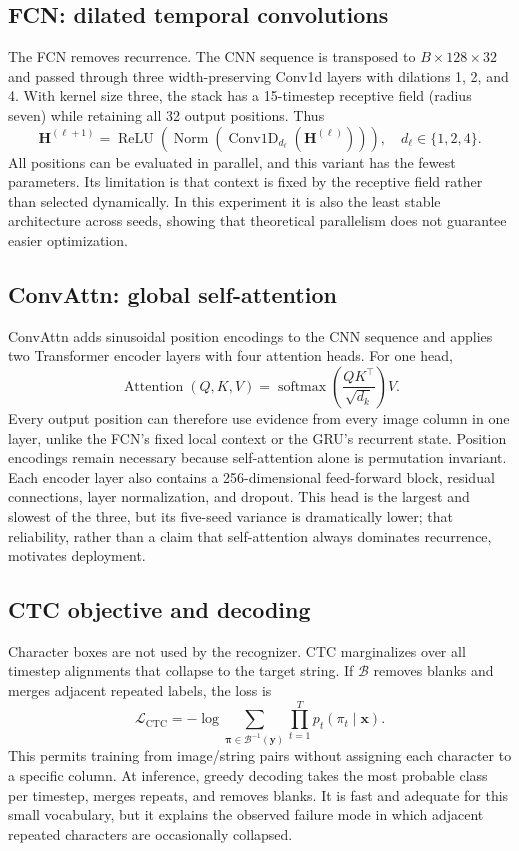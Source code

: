 \documentclass[10pt]{article}
\begin{document}
\subsection{FCN: dilated temporal convolutions}

The FCN removes recurrence. The CNN sequence is transposed to
$B\times128\times32$ and passed through three width-preserving Conv1d layers with
dilations 1, 2, and 4. With kernel size three, the stack has a 15-timestep receptive
field (radius seven) while retaining all 32 output positions. Thus
\[
 \mathbf{H}^{(\ell+1)} =
 \operatorname{ReLU}\!\left(
 \operatorname{Norm}\!\left(
 \operatorname{Conv1D}_{d_\ell}(\mathbf{H}^{(\ell)})
 \right)\right),\quad d_\ell\in\{1,2,4\}.
\]
All positions can be evaluated in parallel, and this variant has the fewest parameters.
Its limitation is that context is fixed by the receptive field rather than selected
dynamically. In this experiment it is also the least stable architecture across seeds,
showing that theoretical parallelism does not guarantee easier optimization.

\subsection{ConvAttn: global self-attention}

ConvAttn adds sinusoidal position encodings to the CNN sequence and applies two
Transformer encoder layers with four attention heads. For one head,
\[
 \operatorname{Attention}(Q,K,V)=
 \operatorname{softmax}\!\left(\frac{QK^\top}{\sqrt{d_k}}\right)V.
\]
Every output position can therefore use evidence from every image column in one layer,
unlike the FCN's fixed local context or the GRU's recurrent state. Position encodings
remain necessary because self-attention alone is permutation invariant. Each encoder
layer also contains a 256-dimensional feed-forward block, residual connections, layer
normalization, and dropout. This head is the largest and slowest of the three, but its
five-seed variance is dramatically lower; that reliability, rather than a claim that
self-attention always dominates recurrence, motivates deployment.

\subsection{CTC objective and decoding}

Character boxes are not used by the recognizer. CTC marginalizes over all timestep
alignments that collapse to the target string. If $\mathcal{B}$ removes blanks and
merges adjacent repeated labels, the loss is
\[
\mathcal{L}_{\mathrm{CTC}} =
-\log \sum_{\boldsymbol{\pi}\in\mathcal{B}^{-1}(\mathbf{y})}
\prod_{t=1}^{T}p_t(\pi_t\mid\mathbf{x}).
\]
This permits training from image/string pairs without assigning each character to a
specific column. At inference, greedy decoding takes the most probable class per
timestep, merges repeats, and removes blanks. It is fast and adequate for this small
vocabulary, but it explains the observed failure mode in which adjacent repeated
characters are occasionally collapsed.
\end{document}
